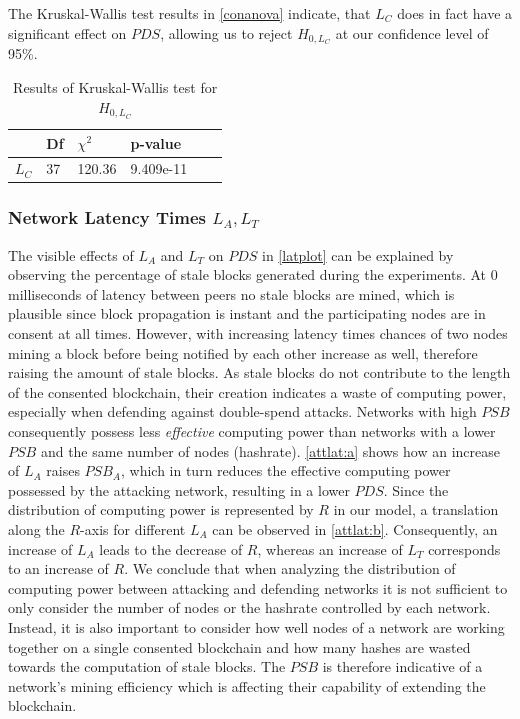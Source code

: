 \documentclass[a4paper,12pt,twoside]{report}
\begin{document}
The Kruskal-Wallis test results in \autoref{conanova} indicate, that $L_C$ does in fact have a significant effect on $PDS$, allowing us to reject $H_{0,L_C}$ at our confidence level of 95\%.
\begin{table}[hb]
\centering
\begin{tabular}{|l|l|l|l|l|l|} \hline
& Df & $\chi^{2}$ & p-value \\ \hline
$L_C$ & 37 &  120.36 & 9.409e-11 \\ \hline
\end{tabular}
\caption{Results of Kruskal-Wallis test for $H_{0,L_C}$}
\label{conanova}
\end{table}
\subsubsection{Network Latency Times $L_{A},L_T$}
The visible effects of $L_{A}$ and $L_{T}$ on $PDS$ in \autoref{latplot} can be explained by observing the percentage of stale blocks generated during the experiments. At 0 milliseconds of latency between peers no stale blocks are mined, which is plausible since block propagation is instant and the participating nodes are in consent at all times. However, with increasing latency times chances of two nodes mining a block before being notified by each other increase as well, therefore raising the amount of stale blocks. As stale blocks do not contribute to the length of the consented blockchain, their creation indicates a waste of computing power, especially when defending against double-spend attacks. Networks with high $PSB$ consequently possess less \textit{effective} computing power than networks with a lower $PSB$ and the same number of nodes (hashrate). \autoref{attlat:a} shows how an increase of $L_{A}$ raises $PSB_A$, which in turn reduces the effective computing power possessed by the attacking network, resulting in a lower $PDS$. Since the distribution of computing power is represented by $R$ in our model, a translation along the $R$-axis for different $L_{A}$ can be observed in \autoref{attlat:b}. Consequently, an increase of $L_{A}$ leads to the decrease of $R$, whereas an increase of $L_{T}$ corresponds to an increase of $R$. We conclude that when analyzing the distribution of computing power between attacking and defending networks it is not sufficient to only consider the number of nodes or the hashrate controlled by each network. Instead, it is also important to consider how well nodes of a network are working together on a single consented blockchain and how many hashes are wasted towards the computation of stale blocks. The $PSB$ is therefore indicative of a network's mining efficiency which is affecting their capability of extending the blockchain. 
\end{document}
